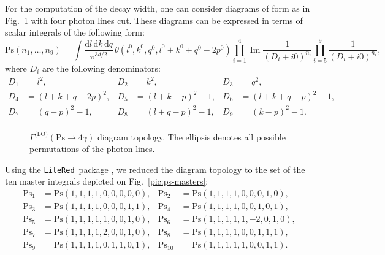 \documentclass[sort&compress]{elsarticle}
\newcommand{\LiteRed}{\texttt{LiteRed}}
\renewcommand{\Im}{\operatorname{Im}}
\begin{document}
For the computation of the decay width, one can consider diagrams of form as in Fig.~\ref{pic:ps-topology} with four photon lines cut.
These diagrams can be expressed in terms of scalar integrals of the following form:
\begin{equation}
	\label{eq:ps-topology}
	\mathrm{Ps}(n_1, \ldots, n_9) =
		\int \frac{\mathrm{d}l \, \mathrm{d}k \, \mathrm{d}q}{\pi^{3d/2}} \,
		\theta(l^0, k^0, q^0, l^0+k^0+q^0-2p^0)
		\prod_{i=1}^4 \Im\frac{1}{(D_i + i0)^{n_i}} \prod_{i=5}^9 \frac{1}{(D_i + i0)^{n_i}},
\end{equation}
where $D_i$ are the following denominators:
\begin{equation}
\begin{aligned}
	D_{1} &= l^2, & 
	D_{2} &= k^2, &
	D_{3} &= q^2, \\ 
	D_{4} &= (l+k+q-2p)^2, &
	D_{5} &= (l+k-p)^2-1, &
	D_{6} &= (l+k+q-p)^2-1, \\
	D_{7} &= (q-p)^2-1, &
	D_{8} &= (l+q-p)^2-1, &
	D_{9} &= (k-p)^2-1. \\
\end{aligned}
\end{equation}%
\begin{figure}
	\centering
	\caption{$\Gamma^{\text{(LO)}}(\mathrm{Ps} \to 4\gamma)$ diagram topology. The ellipsis denotes all possible permutations of the photon lines.}
	\label{pic:ps-topology}
\end{figure}%
Using the \LiteRed\ package \cite{Lee:2013mka}, we reduced the diagram topology to the set of the ten master integrals depicted on Fig.~\ref{pic:ps-masters}:
\begin{equation}
	\begin{aligned}
		\mathrm{Ps}_1    &= \mathrm{Ps}(1, 1, 1, 1, 0, 0, 0, 0, 0), &
		\mathrm{Ps}_2    &= \mathrm{Ps}(1, 1, 1, 1, 0, 0, 0, 1, 0), \\
		\mathrm{Ps}_3    &= \mathrm{Ps}(1, 1, 1, 1, 0, 0, 0, 1, 1), &
		\mathrm{Ps}_4    &= \mathrm{Ps}(1, 1, 1, 1, 0, 0, 1, 0, 1), \\
		\mathrm{Ps}_5    &= \mathrm{Ps}(1, 1, 1, 1, 1, 0, 0, 1, 0), &
		\mathrm{Ps}_6    &= \mathrm{Ps}(1, 1, 1, 1, 1, -2, 0, 1, 0), \\
		\mathrm{Ps}_7    &= \mathrm{Ps}(1, 1, 1, 1, 2, 0, 0, 1, 0), &
		\mathrm{Ps}_8    &= \mathrm{Ps}(1, 1, 1, 1, 0, 0, 1, 1, 1), \\
		\mathrm{Ps}_9    &= \mathrm{Ps}(1, 1, 1, 1, 0, 1, 1, 0, 1), &
		\mathrm{Ps}_{10} &= \mathrm{Ps}(1, 1, 1, 1, 1, 0, 0, 1, 1). \\
	\end{aligned}
\end{equation}
\end{document}

